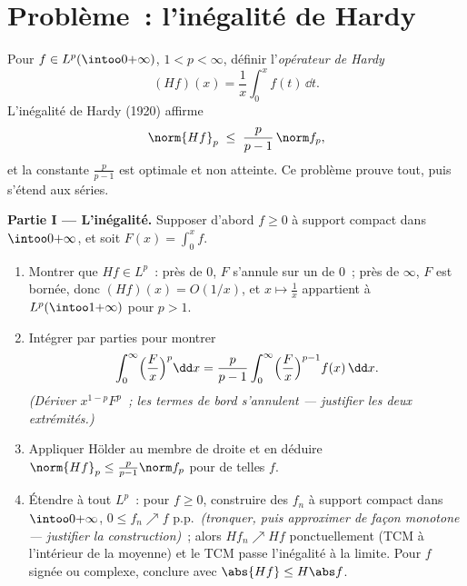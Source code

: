 \section{Problème~: l'inégalité de Hardy}

\begin{problem}\label{pb:b3:lp:1}
Pour $f \in L^p(\intoo0{+\infty})$, $1 < p < \infty$,
définir l'\emph{opérateur de Hardy}
\[
(Hf)(x) = \frac1x\int_0^x f(t)\,\dd t .
\]
L'inégalité de Hardy (1920) affirme
\[
\norm{Hf}_p \;\leq\; \frac{p}{p-1}\,\norm f_p ,
\]
et la constante $\frac p{p-1}$ est optimale et non atteinte.
Ce problème prouve tout, puis s'étend aux séries.

\medskip
\noindent\textbf{Partie I --- L'inégalité.} Supposer d'abord
$f \geq 0$  à support compact dans
$\intoo0{+\infty}$, et soit $F(x) = \int_0^xf$.
\begin{enumerate}
  \item Montrer que $Hf \in L^p$~: près de $0$, $F$ s'annule
        sur un  de $0$~; près de $\infty$, $F$ est
        bornée, donc $(Hf)(x) = O(1/x)$, et $x \mapsto
        \frac1x$ appartient à $L^p(\intoo1{+\infty})$ pour
        $p > 1$.
  \item Intégrer par parties pour montrer
        \[
        \int_0^\infty \Bigl(\frac Fx\Bigr)^p\dd x
        = \frac{p}{p-1}\int_0^\infty\Bigl(\frac
        Fx\Bigr)^{p-1}f(x)\,\dd x .
        \]
        \emph{(Dériver $x^{1-p}F^p$~; les termes de bord
        s'annulent --- justifier les deux extrémités.)}
  \item Appliquer Hölder au membre de droite et en déduire
        $\norm{Hf}_p \leq \frac p{p-1}\norm f_p$ pour de
        telles $f$.
  \item Étendre à tout $L^p$~: pour $f \geq 0$, construire
        des $f_n$  à support compact dans
        $\intoo0{+\infty}$, $0 \leq f_n \nearrow f$ p.p.\
        \emph{(tronquer, puis approximer de façon monotone
        --- justifier la construction)}~; alors $Hf_n
        \nearrow Hf$ ponctuellement (TCM à l'intérieur de
        la moyenne) et le TCM passe l'inégalité à la
        limite. Pour $f$ signée ou complexe, conclure avec
        $\abs{Hf} \leq H\abs f$.
\end{enumerate}


\end{problem}
